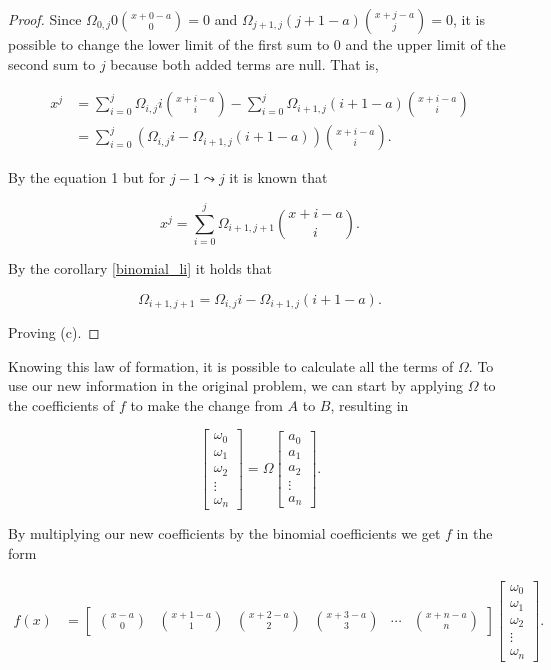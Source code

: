 \documentclass[12pt]{article}
\begin{document}
\begin{proof}
    Since $\Omega_{0,j} 0 \binom{x+0-a}{0} = 0$ and $\Omega_{j+1,j} (j+1-a) \binom{x+j-a}{j} = 0$, it is possible to change the lower limit of the first sum to $0$ and the upper limit of the second sum to $j$ because both added terms are null. That is,

    \begin{align*}
        x^j & = \sum_{i = 0}^{j}\Omega_{i,j} i \binom{x+i-a}{i} - \sum_{i = 0}^{j} \Omega_{i+1,j} (i+1-a) \binom{x+i-a}{i} \\
            & = \sum_{i = 0}^{j} \left( \Omega_{i,j} i - \Omega_{i+1,j} (i+1-a) \right) \binom{x+i-a}{i}.
    \end{align*}

    By the equation 1 but for $j-1 \leadsto j$ it is known that

    $$
        x^j = \sum_{i = 0}^{j}\Omega_{i+1,j+1}\binom{x+i-a}{i}.
    $$

    By the corollary \ref{binomial_li} it holds that

    $$
        \Omega_{i+1,j+1} = \Omega_{i,j} i - \Omega_{i+1,j} (i+1-a).
    $$

    Proving (c).

\end{proof}

\vspace{20px}

Knowing this law of formation, it is possible to calculate all the terms of $\Omega$. To use our new information in the original problem, we can start by applying $\Omega$ to the coefficients of $f$ to make the change from $A$ to $B$, resulting in

$$
    \begin{bmatrix}
        \omega_0 \\ \omega_1 \\ \omega_2 \\ \vdots \\ \omega_n
    \end{bmatrix} = \Omega
    \begin{bmatrix}
        a_0 \\ a_1 \\ a_2 \\ \vdots \\ a_n
    \end{bmatrix}.
$$

By multiplying our new coefficients by the binomial coefficients we get $f$ in the form

\begin{align*}
    f(x) & =
    \begin{bmatrix}
        \binom{x-a}{0} & \binom{x+1-a}{1} & \binom{x+2-a}{2} & \binom{x+3-a}{3} & \cdots & \binom{x+n-a}{n}
    \end{bmatrix} \begin{bmatrix}
                      \omega_0 \\ \omega_1 \\ \omega_2 \\ \vdots \\ \omega_n
                  \end{bmatrix}.
\end{align*}
\end{document}
